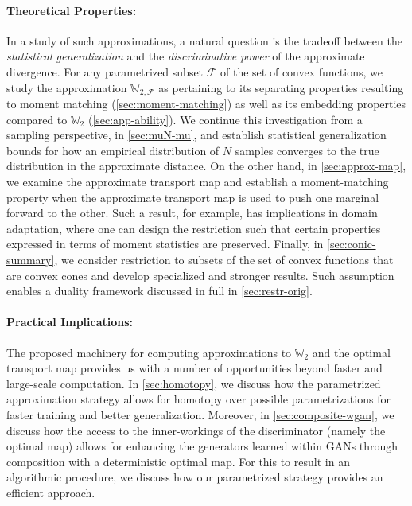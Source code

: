 \documentclass[10pt]{article}
\newcommand{\W}{\mathds{W}}
\newcommand{\calF}{\mathcal{F}}
\numberwithin{equation}{section}
\begin{document}
\paragraph{Theoretical Properties:}
In a study of such approximations, a natural question is the tradeoff between the {\em statistical generalization} and the {\em discriminative power} of the approximate divergence. For any parametrized subset $\calF$ of the set of convex functions, we study the approximation $\W_{2,\calF}$ as pertaining to its separating properties resulting to moment matching (\autoref{sec:moment-matching}) as well as its embedding properties compared to $\W_2$ (\autoref{sec:app-ability}). We continue this investigation from a sampling perspective, in \autoref{sec:muN-mu}, and establish statistical generalization bounds for how an empirical distribution of $N$ samples converges to the true distribution in the approximate distance. 
%
On the other hand, in \autoref{sec:approx-map}, we examine the approximate transport map and establish a moment-matching property when the approximate transport map is used to push one marginal forward to the other. Such a result, for example, has implications in domain adaptation, where one can design the restriction such that certain properties expressed in terms of moment statistics are preserved. Finally, in \autoref{sec:conic-summary}, we consider restriction to subsets of the set of convex functions that are convex cones and develop specialized and stronger results. Such assumption enables a duality framework discussed in full in \autoref{sec:restr-orig}.

\paragraph{Practical Implications:} 
The proposed machinery for computing approximations to $\W_2$ and the optimal transport map provides us with a number of opportunities beyond faster and large-scale computation. In \autoref{sec:homotopy}, we discuss how the parametrized approximation strategy allows for homotopy over possible parametrizations for faster training and better generalization. Moreover, in \autoref{sec:composite-wgan}, we discuss how the access to the inner-workings of the discriminator (namely the optimal map) allows for enhancing the generators learned within GANs through composition with a deterministic optimal map. For this to result in an algorithmic procedure, we discuss how our parametrized strategy provides an efficient approach. 
\end{document}
